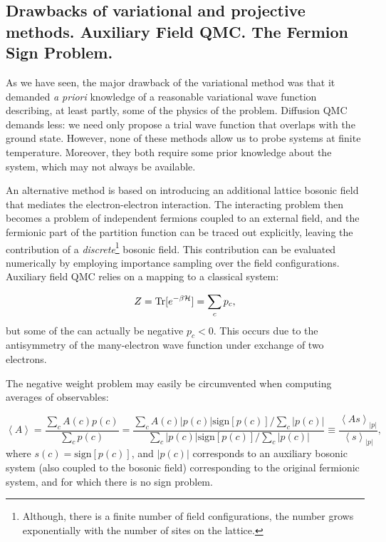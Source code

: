 \subsection{Drawbacks of variational and projective methods. Auxiliary Field \acs{QMC}. The Fermion Sign Problem.}
\label{subsec:introAFQMC}

As we have seen, the major drawback of the variational method was that it demanded \emph{a priori} knowledge of a reasonable variational wave function describing, at least partly, some of the physics of the problem.
Diffusion \acs{QMC} demands less: we need only propose a trial wave function that overlaps with the ground state.
However, none of these methods allow us to probe systems at finite temperature.
Moreover, they both require some prior knowledge about the system, which may not always be available.

An alternative method is based on introducing an additional lattice bosonic field that mediates the electron-electron interaction.
The interacting problem then becomes a problem of independent fermions coupled to an external field, and the fermionic part of the partition function can be traced out explicitly, leaving the contribution of a \emph{discrete}\footnote{Although, there is a finite number of field configurations, the number grows exponentially with the number of sites on the lattice.} bosonic field.
This contribution can be evaluated numerically by employing importance sampling over the field configurations.
Auxiliary field \acs{QMC} relies on a mapping to a classical system:

\begin{equation}
Z = \operatorname{Tr} [ e^{-\beta \mathcal{H} } ] = \sum_c p_c ,
\end{equation}
but some of the  can actually be negative $p_c < 0$.
This occurs due to the antisymmetry of the many-electron wave function under exchange of two electrons.

The negative weight problem may easily be circumvented when computing averages of observables:

\begin{equation}\label{eq:signSampling}
\left\langle A \right\rangle = \frac{\sum_c A ( c ) p ( c )}{\sum_c p ( c ) } = \frac{\sum_c A ( c )|  p ( c ) | \text{sign}[p(c)] / \sum_c | p ( c ) | }{\sum_c  |  p ( c ) | \text{sign}[p(c)] /  \sum_c | p ( c ) |} \equiv \frac{\left\langle A s \right\rangle_{|p|}}{\left\langle s \right\rangle_{|p|}} ,
\end{equation}
where $s(c) = \text{sign} [ p ( c ) ]$, and $| p ( c ) | $ corresponds to an auxiliary bosonic system (also coupled to the bosonic field) corresponding to the original fermionic system, and for which there is no sign problem.

